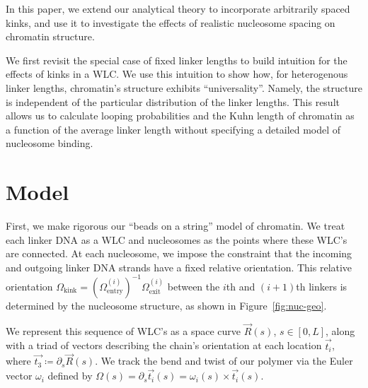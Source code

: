 \documentclass[%
 reprint,
superscriptaddress,
showpacs,preprintnumbers,
 amsmath,amssymb,
 aps,
 prl,
]{revtex4-1}
\begin{document}
In this paper, we extend our analytical theory to incorporate arbitrarily spaced
    kinks, and use it to investigate the effects of realistic nucleosome spacing
    on chromatin structure.

We first revisit the special case of fixed linker lengths to build intuition for
    the effects of kinks in a WLC.\@
We use this intuition to show how, for heterogenous linker lengths,
    chromatin's structure exhibits ``universality''.
Namely, the structure is independent of the particular distribution of the
    linker lengths.
This result allows us to calculate looping probabilities and the Kuhn length
    of chromatin as a function of the average linker length without specifying a
    detailed model of nucleosome binding.


\section{\label{sec:model}Model}
First, we make rigorous our ``beads on a string'' model of chromatin.
We treat each linker DNA as a WLC and nucleosomes as the points where these
    WLC's are connected.
At each nucleosome, we impose the constraint that the incoming and outgoing
    linker DNA strands have a fixed relative orientation. This relative
    orientation $\Omega_\text{kink}  = {(\Omega^{(i)}_\text{entry})}^{-1}
    \Omega^{(i)}_\text{exit}$ between the $i$th and $(i+1)$th linkers is
    determined by the nucleosome structure, as shown in
    Figure~\ref{fig:nuc-geo}.

We represent this sequence of WLC's as a space curve $\vec{R}(s)$, $s\in[0,L]$, along
    with a triad of vectors describing the chain's orientation at each location
    $\vec{t_i}$, where $\vec{t_3} \coloneqq \partial_s \vec{R}(s)$.
We track the bend and twist of our polymer via the Euler vector $\omega_i$
    defined by ${\Omega(s) = \partial_s \vec{t_i}(s) = \omega_i(s) \times
    \vec{t_i}(s)}$.
\end{document}
